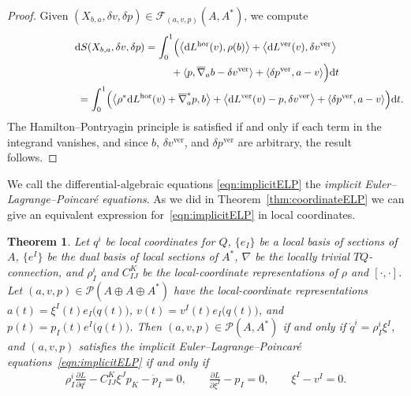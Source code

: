 \documentclass[10pt,a4paper]{amsart}
\numberwithin{equation}{section}
\newtheorem{Theorem}{Theorem}[section]
\begin{document}
\begin{proof} Given $ ( X _{ b, a } , \delta v, \delta p ) \in \mathcal{F} _{ (a,v,p) } ( A , A ^\ast ) $, we compute
 \begin{gather*}
 \mathrm{d} S ( X _{ b, a } , \delta v , \delta p ) = \int _0 ^1 \Bigl( \bigl\langle \mathrm{d} L ^\text{hor} (v) ,
 \rho (b) \bigr\rangle + \bigl\langle \mathrm{d} L ^\text{ver} (v), \delta v ^\text{ver} \bigr\rangle \\
 \hphantom{\mathrm{d} S ( X _{ b, a } , \delta v , \delta p ) = \int _0 ^1}{} + \langle p , \overline{ \nabla } _a
 b - \delta v ^\text{ver} \rangle + \langle \delta p^\text{ver} , a - v \rangle \Bigr) \mathrm{d}t\\
\hphantom{\mathrm{d} S ( X _{ b, a } , \delta v , \delta p )}{}
 = \int _0 ^1 \Bigl( \bigl\langle \rho ^\ast \mathrm{d} L ^\text{hor} (v) + \overline{ \nabla } _a ^\ast p , b
 \bigr\rangle + \bigl\langle \mathrm{d} L ^\text{ver} (v) - p , \delta v ^\text{ver} \bigr\rangle + \langle \delta p ^\text{ver}, a - v \rangle \Bigr)
\mathrm{d}t .
 \end{gather*}
 The Hamilton--Pontryagin principle is satisf\/ied if and only if each term in the integrand vanishes, and since $b$, $ \delta v ^\text{ver} $, and $ \delta p ^\text{ver} $ are arbitrary, the result follows.
\end{proof}

We call the dif\/ferential-algebraic equations \eqref{eqn:implicitELP} the \emph{implicit Euler--Lagrange--Poincar\'e equations}. As we did in Theorem~\ref{thm:coordinateELP} we can give an equivalent expression for~\eqref{eqn:implicitELP} in local coordinates.

\begin{Theorem}
Let $ q ^i $ be local coordinates for $Q$, $ \{ e _I \} $ be a local basis of sections of $A$, $ \{ e ^I \} $ be the dual basis of local sections of $ A ^\ast $, $ \nabla $ be the locally trivial $ T Q $-connection, and $ \rho ^i _I $ and $ C _{ I J } ^K $ be the local-coordinate representations of $ \rho $ and $ [\cdot , \cdot ] $. Let $ ( a, v, p ) \in \mathcal{P} ( A \oplus A \oplus A ^\ast ) $ have the local-coordinate representations $ a (t) = \xi ^I (t) e _I \bigl( q (t) \bigr) $, $ v (t) = v ^I (t) e _I \bigl( q (t) \bigr) $, and $ p (t) = p _I (t) e ^I \bigl( q (t) \bigr) $. Then $ ( a, v, p ) \in \mathcal{P} ( A , A ^\ast ) $ if and only if $ \dot{q} ^i = \rho ^i _I \xi ^I $, and $ ( a, v, p ) $ satisfies the implicit Euler--Lagrange--Poincar\'e equations~\eqref{eqn:implicitELP} if and only if
\begin{gather*}
\rho ^i _I \frac{ \partial L }{ \partial q ^i } - C ^K _{ I J } \xi ^J p _K - \dot{p} _I = 0 , \qquad
\frac{ \partial L }{ \partial \xi ^I } - p _I = 0 , \qquad \xi ^I - v ^I = 0 .
\end{gather*}
\end{Theorem}
\end{document}

